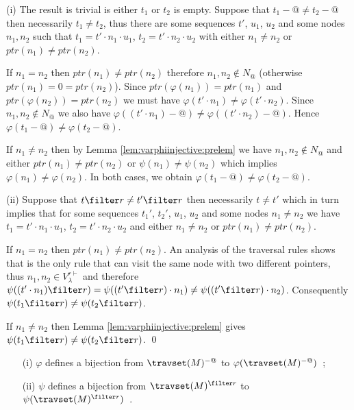 
(i) The result is trivial is either $t_1$ or $t_2$ is empty.
Suppose that $t_1-@\neq t_2-@$ then necessarily $t_1 \neq t_2$, thus there are some sequences $t'$, $u_1$, $u_2$ and some nodes $n_1,n_2$ such that
 $t_1 = t' \cdot n_1 \cdot u_1$, $t_2 = t' \cdot n_2 \cdot u_2$ with either $n_1\neq n_2$ or $ptr(n_1) \neq ptr(n_2)$.

If $n_1 = n_2$ then $ptr(n_1) \neq ptr(n_2)$ therefore $n_1,n_2 \not\in N_@$ (otherwise $ptr(n_1) = 0 = ptr(n_2)$). Since $ptr(\varphi(n_1)) = ptr(n_1)$ and  $ptr(\varphi(n_2)) = ptr(n_2)$ we must have $\varphi(t' \cdot n_1) \neq \varphi(t' \cdot n_2)$. Since $n_1,n_2 \not\in N_@$ we also have $\varphi((t' \cdot n_1)-@) \neq \varphi((t' \cdot n_2)-@)$. Hence $\varphi(t_1-@) \neq \varphi(t_2-@)$.

If $n_1 \neq n_2$ then by Lemma \ref{lem:varphiinjective:prelem} we have $n_1,n_2 \not\in N_@$ and 
either $ptr(n_1) \neq ptr(n_2)$ or $\psi(n_1) \neq \psi(n_2)$ which implies $\varphi(n_1) \neq \varphi(n_2)$.
In both cases, we obtain $\varphi(t_1-@) \neq \varphi(t_2-@)$.


(ii) Suppose that $t \filter r \neq t' \filter r$ then necessarily $t \neq t'$ which in turn implies that for some sequences $t_1'$, $t_2'$, $u_1$, $u_2$ and some nodes $n_1 \neq n_2$
we have $t_1 = t' \cdot n_1 \cdot u_1$, $t_2 = t' \cdot n_2 \cdot u_2$ and either $n_1\neq n_2$ or $ptr(n_1) \neq ptr(n_2)$.

If $n_1 = n_2$ then $ptr(n_1) \neq ptr(n_2)$. An analysis of the traversal rules shows that  is the only rule that can visit the same node with two different pointers, thus $n_1,n_2 \in V_\lambda^{r\vdash}$
and therefore $\psi( (t'\cdot n_1) \filter r ) = \psi( (t'\filter r) \cdot n_1 )  \neq \psi( (t'\filter r) \cdot n_2 )$. Consequently $\psi( t_1\filter r ) \neq \psi( t_2\filter r )$.

If $n_1 \neq n_2$ then Lemma \ref{lem:varphiinjective:prelem}
gives $\psi( t_1\filter r ) \neq \psi( t_2\filter r )$. \qed



\begin{corollary} \hfill
\label{cor:varphi_bij}
\begin{itemize}
\item[(i)] $\varphi$ defines a bijection from $\travset(M)^{-@}$
to $\varphi(\travset(M)^{-@})$\ ;
\item[(ii)] $\psi$ defines a bijection from $\travset(M)^{\filter r}$ to
$\psi(\travset(M)^{\filter r})$\ .
\end{itemize}
\end{corollary}

